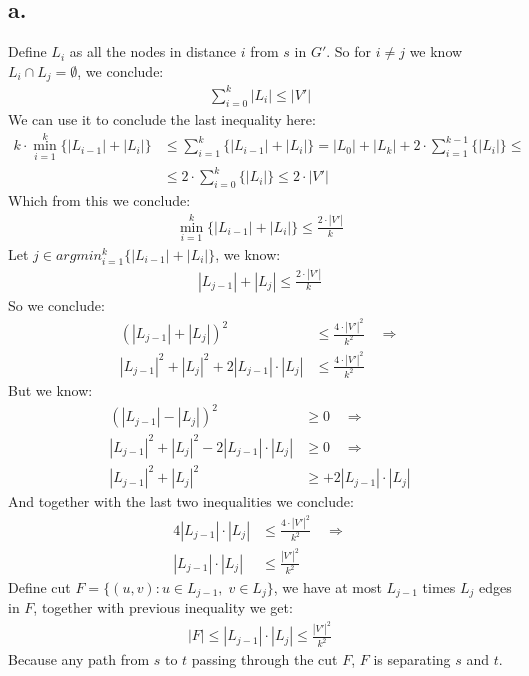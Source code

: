 \documentclass[11pt]{article}
\theoremstyle{plain}
\theoremstyle{nonumberplainnobrackets}
\begin{document}
\subsection*{a.} 
Define $L_i$ as all the nodes in distance $i$ from $s$ in $G'$.
So for $i\ne j$ we know $L_i\cap L_j = \emptyset$, we conclude:
\begin{align*}
\sum_{i=0}^k |L_i| \le |V'|
\end{align*}
We can use it to conclude the last inequality here:
\begin{align*}
k\cdot \min_{i=1}^k\{|L_{i-1}| +|L_i| \} &\le \sum_{i=1}^k\{|L_{i-1}| +|L_i| \} =  |L_0|  + |L_k|+ 2\cdot\sum_{i=1}^{k-1}\{|L_{i}| \} \le \\
& \le 2\cdot\sum_{i=0}^{k}\{|L_{i}| \} \le 2\cdot |V'|
\end{align*}
Which from this we conclude:
\begin{align*}
 \min_{i=1}^k\{|L_{i-1}| +|L_i| \} \le \frac{2\cdot |V'|}{k}
\end{align*}
Let $j\in argmin_{i=1}^k\{|L_{i-1}| +|L_i| \} $, we know:
\begin{align*}
|L_{j-1}| +|L_j|  \le \frac{2\cdot |V '|}{k}
\end{align*}
So we conclude:
\begin{align*}
(|L_{j-1}| +|L_j|)^2  &\le \frac{4\cdot |V '|^2}{k^2} \quad\Rightarrow\\
|L_{j-1}|^2 +|L_j|^2 + 2|L_{j-1}|\cdot|L_j|  &\le \frac{4\cdot |V '|^2}{k^2} 
\end{align*}
But we know:
\begin{align*}
(|L_{j-1}| -|L_j|)^2 &\ge 0 \quad\Rightarrow\\
|L_{j-1}|^2  + |L_j|^2 - 2|L_{j-1}|\cdot|L_j|  &\ge 0 \quad\Rightarrow\\
|L_{j-1}|^2  + |L_j|^2 &\ge + 2|L_{j-1}|\cdot|L_j|
\end{align*}
And together with the last two inequalities we conclude:
\begin{align*}
4|L_{j-1}|\cdot|L_j| &\le \frac{4\cdot |V '|^2}{k^2}  \quad\Rightarrow\\
|L_{j-1}|\cdot|L_j| &\le \frac{ |V '|^2}{k^2} 
\end{align*} 
Define cut $F=\{(u,v)  :u\in L_{j-1},\;v\in L_j \}$, we have at most $L_{j-1}$ times $L_j$ edges in $F$, together with previous inequality we get:
\begin{align*}
|F| \le |L_{j-1}|\cdot |L_j| \le \frac{|V'|^2}{k^2}
\end{align*}
Because any path from $s$ to $t$ passing through the cut $F$, $F$ is separating $s$ and $t$.
\end{document}
